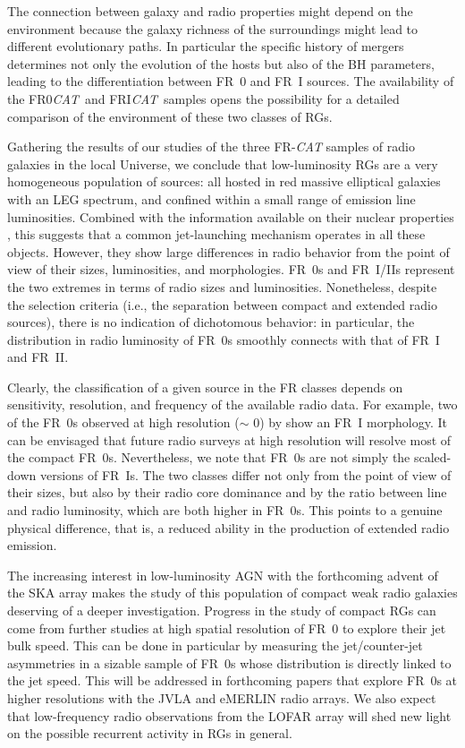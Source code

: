 \documentclass[traditabstract]{aa}
\newcommand{\FR}{FRI{\sl{CAT}}}\newcommand{\FRII}{FRII{\sl{CAT}}}
\newcommand{\FRo}{FR0{\sl{CAT}}}
\begin{document}
The connection between galaxy and radio properties might depend on the
environment because the galaxy richness of the surroundings might lead
to different evolutionary paths. In particular the specific history of
mergers determines not only the evolution of the hosts but also of the
BH parameters, leading to the differentiation between FR~0 and FR~I
sources. The availability of the \FRo\ and \FR\ samples opens the
possibility for a detailed comparison of the environment of these two
classes of RGs.

Gathering the results of our studies of the three FR-{\it CAT} samples
of radio galaxies in the local Universe, we conclude that
low-luminosity RGs are a very homogeneous population of sources: all
hosted in red massive elliptical galaxies with an LEG spectrum, and
confined within a small range of emission line luminosities. Combined
with the information available on their nuclear properties
\citep{baldi15}, this suggests that a common jet-launching mechanism
operates in all these objects. However, they show large differences in
radio behavior from the point of view of their sizes, luminosities,
and morphologies. FR~0s and FR~I/IIs represent the two extremes in
terms of radio sizes and luminosities. Nonetheless, despite the
selection criteria (i.e., the separation between compact and extended
radio sources), there is no indication of dichotomous behavior: in
particular, the distribution in radio luminosity of FR~0s smoothly
connects with that of FR~I and FR~II.

Clearly, the classification of a given source in the FR classes
depends on sensitivity, resolution, and frequency of the available
radio data. For example, two of the FR~0s observed at high resolution
($\sim$ 0) by \citet{baldi16} show an FR~I morphology. It can
be envisaged that future radio surveys at high resolution will resolve
most of the compact FR~0s. Nevertheless, we note that FR~0s are not
simply the scaled-down versions of FR~Is. The two classes differ not
only from the point of view of their sizes, but also by their radio
core dominance and by the ratio between line and radio luminosity,
which are both higher in FR~0s. This points to a genuine physical
difference, that is, a reduced ability in the production of extended
radio emission.

The increasing interest in low-luminosity AGN with the forthcoming
advent of the SKA array \citep{whittam17} makes the study of this
population of compact weak radio galaxies deserving of a deeper
investigation. Progress in the study of compact RGs can come from
further studies at high spatial resolution of FR~0 to explore their
jet bulk speed. This can be done in particular by measuring the
jet/counter-jet asymmetries in a sizable sample of FR~0s whose
distribution is directly linked to the jet speed. This will be
addressed in forthcoming papers that explore FR~0s at higher
resolutions with the JVLA and eMERLIN radio arrays. We also expect
that low-frequency radio observations from the LOFAR array will shed
new light on the possible recurrent activity in RGs in general.
\end{document}
